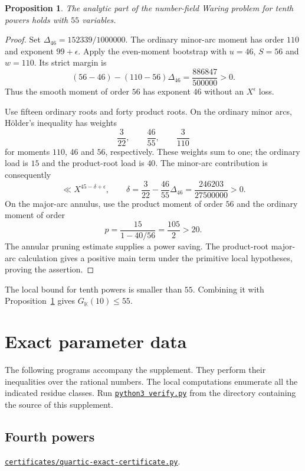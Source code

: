 \documentclass[11pt]{amsart}
\newtheorem{proposition}[theorem]{Proposition}
\theoremstyle{definition}
\numberwithin{equation}{section}
\begin{document}
\begin{proposition}\label{prop:tenth-55-analytic}
The analytic part of the number-field Waring problem for tenth powers
holds with $55$ variables.
\end{proposition}
\begin{proof}
Set $\Delta_{46}=152339/1000000$. The ordinary minor-arc moment has
order $110$ and exponent $99+\epsilon$. Apply the even-moment bootstrap
with $u=46$, $S=56$ and $w=110$. Its strict margin is
\[
 (56-46)-(110-56)\Delta_{46}=\frac{886847}{500000}>0.
\]
Thus the smooth moment of order $56$ has exponent $46$ without an
$X^\epsilon$ loss.

Use fifteen ordinary roots and forty product roots. On the ordinary
minor arcs, H\"older's inequality has weights
\[
 \frac3{22},\qquad\frac{46}{55},\qquad\frac3{110}
\]
for moments $110$, $46$ and $56$, respectively. These weights sum to one;
the ordinary load is $15$ and the product-root load is $40$.
The minor-arc contribution is consequently
\[
 \ll X^{45-\delta+\epsilon},\qquad
 \delta=\frac3{22}-\frac{46}{55}\Delta_{46}
       =\frac{246203}{27500000}>0.
\]
On the major-arc annulus, use the product moment of order $56$ and the
ordinary moment of order
\[
 p=\frac{15}{1-40/56}=\frac{105}{2}>20.
\]
The annular pruning estimate supplies a power saving. The product-root
major-arc calculation gives a positive main term under the primitive
local hypotheses, proving the assertion.
\end{proof}

The local bound for tenth powers is smaller than $55$. Combining it with
Proposition~\ref{prop:tenth-55-analytic} gives $G_{\mathbb K}(10)\le55$.

\appendix
\section{Exact parameter data}\label{app:certificates}
The following programs accompany the supplement. They perform their
inequalities over the rational numbers. The local computations enumerate
all the indicated residue classes. Run \href{https://github.com/morley988/warings-problem/blob/3752a566d4ae778c3f2effaeb7caec4fc8899514/supplements/number-field/small-powers/verify.py}{\texttt{python3 verify.py}} from
the directory containing the source of this supplement.

\subsection{Fourth powers}\label{app:quartic-exact-certificate}
\href{https://github.com/morley988/warings-problem/blob/3752a566d4ae778c3f2effaeb7caec4fc8899514/supplements/number-field/small-powers/certificates/quartic-exact-certificate.py}{\texttt{certificates/quartic-exact-certificate.py}}.
\end{document}
